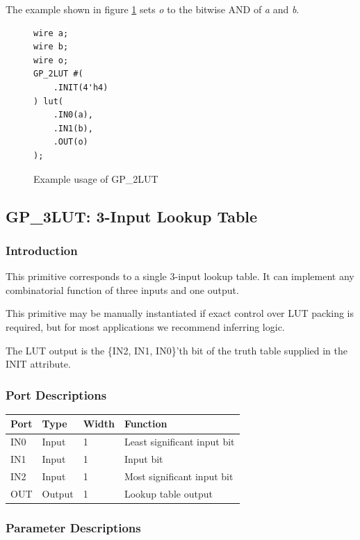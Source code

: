 \documentclass{article}
\begin{document}
The example shown in figure \ref{gp-2LUT-example} sets \emph{o} to the bitwise AND of \emph{a} and \emph{b}.

\begin{figure}[h]
\begin{lstlisting}
wire a;
wire b;
wire o;
GP_2LUT #(
	.INIT(4'h4)
) lut(
	.IN0(a),
	.IN1(b),
	.OUT(o)
);
\end{lstlisting}
\caption{Example usage of GP\_2LUT}
\label{gp-2LUT-example}
\end{figure}


\pagebreak
\subsection{GP\_3LUT: 3-Input Lookup Table}

\subsubsection{Introduction}
This primitive corresponds to a single 3-input lookup table. It can implement any combinatorial function of three 
inputs and one output.

This primitive may be manually instantiated if exact control over LUT packing is required, but for most applications we 
recommend inferring logic.

The LUT output is the \{IN2, IN1, IN0\}'th bit of the truth table supplied in the INIT attribute.

\subsubsection{Port Descriptions}

\begin{tabularx}{4in}{|l|l|l|X|}
\hline
{\bfseries Port} & {\bfseries Type} & {\bfseries Width} & {\bfseries Function} \\
\hline
IN0 & Input & 1 & Least significant input bit \\
\hline
IN1 & Input & 1 & Input bit \\
\hline
IN2 & Input & 1 & Most significant input bit \\
\hline
OUT & Output & 1 & Lookup table output \\
\hline
\end{tabularx}

\subsubsection{Parameter Descriptions}
\end{document}
